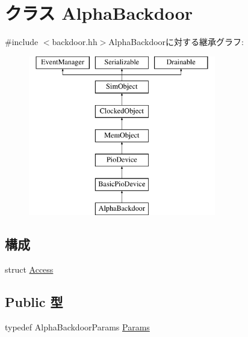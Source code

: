 \hypertarget{classAlphaBackdoor}{
\section{クラス AlphaBackdoor}
\label{classAlphaBackdoor}
}


{\ttfamily \#include $<$backdoor.hh$>$}AlphaBackdoorに対する継承グラフ:\begin{figure}[H]
\begin{center}
\leavevmode
\includegraphics[height=7cm]{classAlphaBackdoor}
\end{center}
\end{figure}
\subsection*{構成}
\begin{DoxyCompactItemize}
\item 
struct \hyperlink{structAlphaBackdoor_1_1Access}{Access}
\end{DoxyCompactItemize}
\subsection*{Public 型}
\begin{DoxyCompactItemize}
\item 
typedef AlphaBackdoorParams \hyperlink{classAlphaBackdoor_a3311d1ef17b579d409e4cf342f9c696f}{Params}
\end{DoxyCompactItemize}
